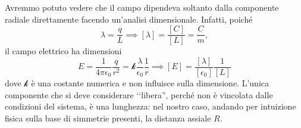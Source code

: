 \begin{observe}
	Avremmo potuto vedere che il campo dipendeva soltanto dalla componente radiale direttamente facendo un'analisi dimensionale. Infatti, poiché
	\begin{equation*}
		\lambda=\frac{q}{L}\implies\left[\lambda\right]=\frac{\left[C\right]}{\left[L\right]}=\frac{C}{m},
	\end{equation*}
	il campo elettrico ha dimensioni
	\begin{equation*}
		E=\frac{1}{4\pi\epsilon_0}\frac{q}{r^2}=\mathcal{k}\frac{\lambda}{\epsilon_0}\frac{1}{r}\implies\left[E\right]=\frac{\left[\lambda\right]}{\left[\epsilon_0\right]}\frac{1}{\left[L\right]}
	\end{equation*}
dove $\mathcal{k}$ è una costante numerica e non influisce sulla dimensione. L'unica componente che si deve considerare ‘‘libera'', perché non è vincolata dalle condizioni del sistema, è una lunghezza: nel nostro caso, andando per intuizione fisica sulla base di simmetrie presenti, la distanza assiale $R$.
\end{observe}

